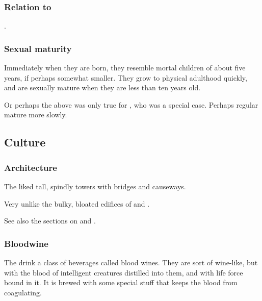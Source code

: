 \subsubsection{Relation to \aryothim}
.





\subsubsection{Sexual maturity}
Immediately when they are born, they resemble mortal children of about five years, if perhaps somewhat smaller. 
They grow to physical adulthood quickly, and are sexually mature when they are less than ten years old. 

Or perhaps the above was only true for \Thanatzil, who was a special case. 
Perhaps regular \resphain{} mature more slowly. 









\subsection{Culture}





\subsubsection{Architecture}
The \resphain{} liked tall, spindly towers with bridges and causeways. 

Very unlike the bulky, bloated edifices of  and . 

See also the sections on  and . 





\subsubsection{Bloodwine}
The \resphain{} drink a class of beverages called blood wines. 
They are sort of wine-like, but with the blood of intelligent creatures distilled into them, and with life force bound in it. 
It is brewed with some special stuff that keeps the blood from coagulating. 

